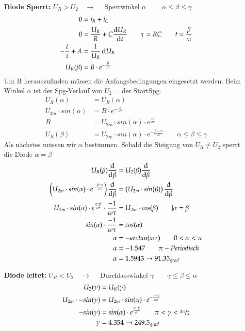 \newline
\textbf{Diode Sperrt:} $ U_R > U_2 \quad \rightarrow \quad $ Sperrwinkel $\alpha$ $\qquad \alpha \leq \beta \leq \gamma$
\begin{align*}
     0 & = i_R + i_C \\
     0 & = \frac{U_R}{R}+ C \frac{\mathop{}\!\mathrm{d} U_R}{\mathop{}\!\mathrm{d} t} \qquad \tau = RC \qquad t = \frac{\beta}{\omega}\\
     - \frac{t}{\tau} + A & = \frac{1}{U_R} \mathop{}\!\mathrm{d} U_R \\
     U_R(\beta) & = B \cdot e^{-\frac{\beta}{\omega \tau}}
     \end{align*}
 Um B herauszufinden müssen die Anfangsbedingungen eingesetzt werden.\newline 
 Beim Winkel $\alpha$ ist der Spg-Verlauf von $U_2$ = der StartSpg. 
     \begin{align*}
     U_R(\alpha) & =U_R(\alpha)\\
     U_{2m} \cdot sin(\alpha) & = B \cdot e^{-\frac{\alpha}{\omega \tau}}\\
     B & = U_{2m} \cdot sin(\alpha) \cdot e^{\frac{\alpha}{\omega \tau}}\\
     U_R(\beta) & =  U_{2m} \cdot sin(\alpha) \cdot e^{-\frac{\beta - \alpha}{\omega \tau}} \qquad \alpha \leq \beta \leq \gamma       
\end{align*}
Als nächstes müssen wir $\alpha$ bestimmen. Sobald die Steigung von $U_R \neq U_{2}$ sperrt die Diode $\alpha = \beta$
\begin{align*}
    U_R(\beta) \frac{\diff}{\diff \beta} & = U_2(\beta) \frac{\diff}{\diff \beta}\\
    \left( U_{2m} \cdot sin(\alpha) \cdot e^{-\frac{\beta - \alpha}{\omega \tau}}\right)\frac{\diff}{\diff \beta} & = \left( U_{2m} \cdot sin(\beta)\right)\frac{\diff}{\diff \beta}\\
    U_{2m}\cdot sin(\alpha)\cdot e^{\frac{\alpha - \beta}{\omega \tau}}\cdot \frac{-1}{\omega \tau} &= U_{2m}\cdot cos(\beta) \qquad | \alpha = \beta\\
    sin(\alpha)\cdot \frac{-1}{\omega \tau} &= cos(\alpha)\\
    \alpha & = -arctan(\omega \tau) \qquad 0 < \alpha < \pi\\
    \alpha & = -1.547 \qquad \pi -Periodisch\\
    \alpha & = 1.5943 \rightarrow 91.35_{grad}
\end{align*}

\textbf{Diode leitet:} $ U_R < U_2 \quad \rightarrow \quad $ Durchlasswinkel $\gamma \qquad \gamma \leq \beta \leq \alpha$
\begin{align*}
    U_2(\gamma) & = U_R(\gamma)\\
    U_{2m}\cdot -sin(\gamma) & = U_{2m} \cdot sin(\alpha) \cdot e^{-\frac{\gamma - \alpha}{\omega \tau}}\\
    -sin(\gamma) & = sin(\alpha) \cdot e^{\frac{\alpha - \gamma}{\omega \tau}} \qquad \pi < \gamma < \nicefrac{3\pi}{2}\\
    \gamma & = 4.354 \rightarrow 249.5_{grad}
\end{align*}


